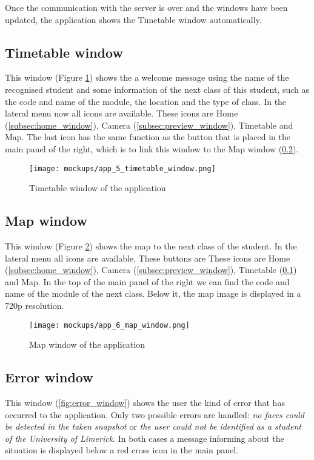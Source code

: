 	Once the communication with the server is over and the windows have been updated, the application shows the Timetable window automatically.

	\subsection{Timetable window}
	\label{subsec:timetable_window}
	This window (Figure \ref{fig:timetable_window}) shows the a welcome message using the name of the recognised student and some information of the next class of this student, such as the code and name of the module, the location and the type of class. In the lateral menu now all icons are available. These icons are Home (\ref{subsec:home_window}), Camera (\ref{subsec:preview_window}), Timetable and Map. The last icon has the same function as the button that is placed in the main panel of the right, which is to link this window to the Map window (\ref{subsec:map_window}). 

	\begin{figure}[!ht]
		\centering
		\texttt{[image: mockups/app\_5\_timetable\_window.png]}
		\caption{Timetable window of the application}
		\label{fig:timetable_window}
	\end{figure}

	\subsection{Map window}
	\label{subsec:map_window}
	This window (Figure \ref{fig:map_window}) shows the map to the next class of the student. In the lateral menu all icons are available. These buttons are These icons are Home (\ref{subsec:home_window}), Camera (\ref{subsec:preview_window}), Timetable (\ref{subsec:timetable_window}) and Map. In the top of the main panel of the right we can find the code and name of the module of the next class. Below it, the map image is displayed in a \gls{720p} resolution.

	\begin{figure}[!ht]
		\centering
		\texttt{[image: mockups/app\_6\_map\_window.png]}
		\caption{Map window of the application}
		\label{fig:map_window}
	\end{figure}

	\subsection{Error window}
	\label{subsec:error_window}
	This window (\ref{fig:error_window}) shows the user the kind of error that has occurred to the application. Only two possible errors are handled: \textit{no faces could be detected in the taken snapshot} or \textit{the user could not be identified as a student of the University of Limerick}. In both cases a message informing about the situation is displayed below a red cross icon in the main panel. 

